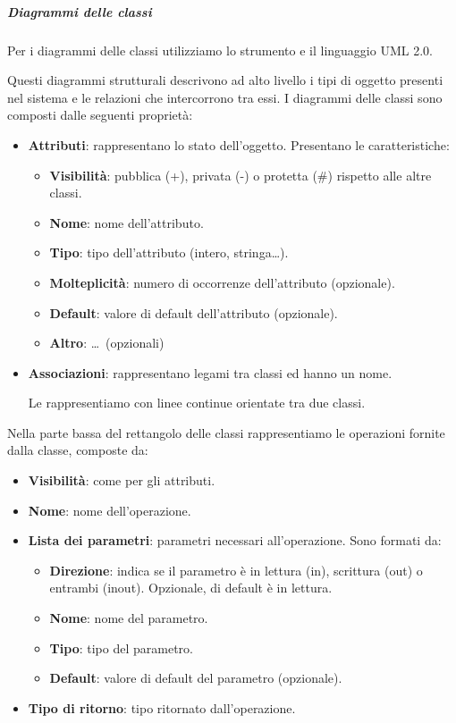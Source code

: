		\subparagraph{Diagrammi delle classi}\label{PP:Sviluppo:DiagrammiClassi}
		Per i diagrammi delle classi utilizziamo lo strumento  e il linguaggio UML 2.0.\par
        Questi diagrammi strutturali descrivono ad alto livello i tipi di oggetto presenti nel sistema e le relazioni che intercorrono tra essi.
		I diagrammi delle classi sono composti dalle seguenti proprietà:
		\begin{itemize}
			\item \textbf{Attributi}: rappresentano lo stato dell'oggetto. Presentano le caratteristiche:
			    \begin{itemize}
			        \item \textbf{Visibilità}: pubblica (+), privata (-) o protetta (\#) rispetto alle altre classi.
			        \item \textbf{Nome}: nome dell'attributo.
			        \item \textbf{Tipo}: tipo dell'attributo (intero, stringa\dots).
			        \item \textbf{Molteplicità}: numero di occorrenze dell'attributo (opzionale).
			        \item \textbf{Default}: valore di default dell'attributo (opzionale).
                    \item \textbf{Altro}: \dots~(opzionali)
			    \end{itemize}
			\item \textbf{Associazioni}: rappresentano legami tra classi ed hanno un nome.\par
                        Le rappresentiamo con linee continue orientate tra due classi.
		\end{itemize}
        Nella parte bassa del rettangolo delle classi rappresentiamo le operazioni fornite dalla classe, composte da:
        \begin{itemize}
            \item \textbf{Visibilità}: come per gli attributi.
            \item \textbf{Nome}: nome dell'operazione.
            \item \textbf{Lista dei parametri}: parametri necessari all'operazione. Sono formati da:
            \begin{itemize}
                \item \textbf{Direzione}: indica se il parametro è in lettura (in), scrittura (out) o entrambi (inout). Opzionale, di default è in lettura.
                \item \textbf{Nome}: nome del parametro.
                \item \textbf{Tipo}: tipo del parametro.
                \item \textbf{Default}: valore di default del parametro (opzionale).
            \end{itemize}
            \item \textbf{Tipo di ritorno}: tipo ritornato dall'operazione.
        \end{itemize}
